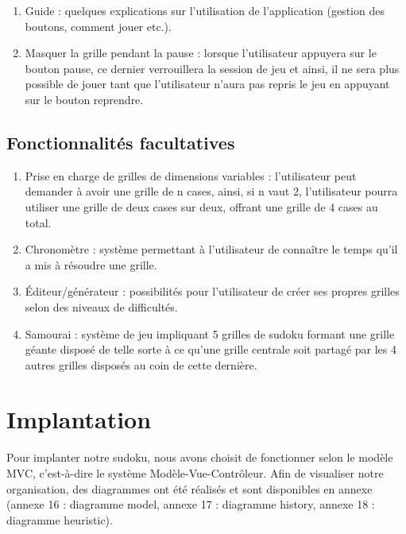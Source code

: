 \begin{enumerate}
  \item Guide : quelques explications sur l'utilisation de l'application 
  (gestion des boutons, comment jouer etc.).\\
 
  \item Masquer la grille pendant la pause : lorsque l'utilisateur appuyera sur le bouton pause, 
  ce dernier verrouillera la session de jeu et ainsi, 
  il ne sera plus possible de jouer tant que l'utilisateur 
  n'aura pas repris le jeu en appuyant sur le bouton reprendre. \\
\end{enumerate}
 
\subsection{Fonctionnalités facultatives}

\begin{enumerate}
  \item Prise en charge de grilles de dimensions variables : 
  l'utilisateur peut demander à avoir une grille de n cases, ainsi,
  si n vaut 2, l'utilisateur pourra utiliser une grille de deux cases sur deux, 
  offrant une grille de 4 cases au total.   \\

 \item Chronomètre : système permettant à l'utilisateur de connaître 
 le temps qu'il a mis à résoudre une grille.  \\
 
 \item Éditeur/générateur : possibilités pour l'utilisateur 
 de créer ses propres grilles selon des niveaux de difficultés. \\
 
 \item Samourai : système de jeu impliquant 5 grilles de sudoku formant une grille géante 
 disposé de telle sorte à ce qu'une grille centrale soit partagé 
 par les 4 autres grilles disposés au coin de cette dernière.  \\
\end{enumerate}

\section{Implantation}
Pour implanter notre sudoku, nous avons choisit de fonctionner selon le modèle MVC, 
c'est-à-dire le système Modèle-Vue-Contrôleur. Afin de visualiser notre organisation, 
des diagrammes ont été réalisés et sont disponibles en annexe 
(annexe 16 : diagramme model,
annexe 17 : diagramme history,
annexe 18 : diagramme heuristic).

